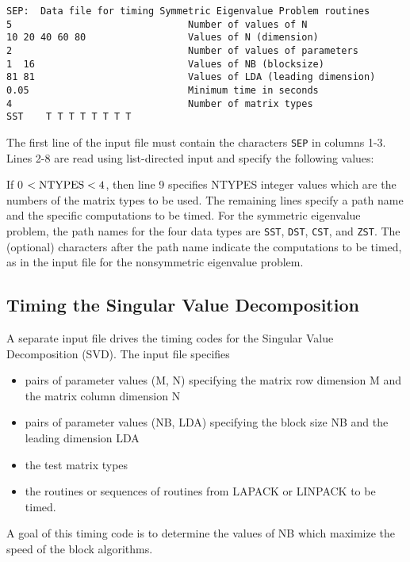 \begin{verbatim}
SEP:  Data file for timing Symmetric Eigenvalue Problem routines
5                               Number of values of N
10 20 40 60 80                  Values of N (dimension)
2                               Number of values of parameters
1  16                           Values of NB (blocksize)
81 81                           Values of LDA (leading dimension)
0.05                            Minimum time in seconds
4                               Number of matrix types
SST    T T T T T T T T 
\end{verbatim}

The first line of the input file 
must contain the characters {\tt SEP} in columns 1-3.
Lines 2-8 are read using list-directed input and specify the following
values:


If 0 $< {\rm NTYPES} < 4$,
then line 9 specifies NTYPES integer values
which are the numbers of the matrix types to be used.
The remaining lines specify a path name and the specific
computations to be timed. 
For the symmetric eigenvalue problem, the path names for the four
data types are {\tt SST}, {\tt DST}, {\tt CST}, and {\tt ZST}. 
The (optional) characters after the path name indicate the computations
to be timed, as in the input file for the nonsymmetric eigenvalue
problem.


\subsection{Timing the Singular Value Decomposition}

\dent
A separate input file drives the timing codes for the Singular Value 
Decomposition (SVD).  The input file specifies
\begin{itemize}
\item pairs of parameter values (M, N) specifying the matrix row
dimension M and the matrix column dimension N
\item pairs of parameter values (NB, LDA) specifying the
block size NB and the leading dimension LDA
\item the test matrix types
\item the routines or sequences of routines from LAPACK or LINPACK
to be timed.
\end{itemize}
A goal of this timing code is to determine
the values of {\rm NB} which maximize the speed of the block algorithms.

